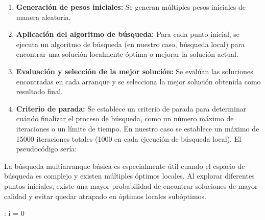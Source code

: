 \begin{enumerate}
\item \textbf{Generación de pesos iniciales:} Se generan múltiples pesos iniciales de manera aleatoria.

\item \textbf{Aplicación del algoritmo de búsqueda:} Para cada punto inicial, se ejecuta un algoritmo de búsqueda (en nuestro caso, búsqueda local) para encontrar una solución localmente óptima o mejorar la solución actual.

\item \textbf{Evaluación y selección de la mejor solución:} Se evalúan las soluciones encontradas en cada arranque y se selecciona la mejor solución obtenida como resultado final.

\item \textbf{Criterio de parada: } Se establece un criterio de parada para determinar cuándo finalizar el proceso de búsqueda, como un número máximo de iteraciones o un límite de tiempo. En nuestro caso se establece un máximo de 15000 iteraciones totales (1000 en cada ejecución de búsqueda local). El pseudocódigo sería:


\end{enumerate}

La búsqueda multiarranque básica es especialmente útil cuando el espacio de búsqueda es complejo y existen múltiples óptimos locales. Al explorar diferentes puntos iniciales, existe una mayor probabilidad de encontrar soluciones de mayor calidad y evitar quedar atrapado en óptimos locales subóptimos.

\begin{algorithm}[H]
	
	
	\BlankLine
	:
	\BlankLine
	i = 0	
	\BlankLine
	
	\;
\end{algorithm}

